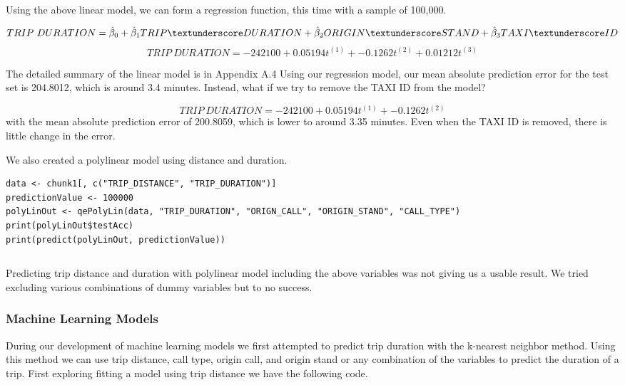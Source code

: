 \documentclass{article}
\numberwithin{equation}{section}
\begin{document}
 \\

Using the above linear model, we can form a regression function, this time with a sample of 100,000. 

\begin{equation}
    TRIP \ DURATION = \hat{\beta}_0 + \hat{\beta}_1 TRIP\textunderscore DURATION + \hat{\beta}_2 ORIGIN \textunderscore STAND + \hat{\beta}_3 TAXI \textunderscore ID \\
\end{equation}
\begin{equation}
    TRIP \ DURATION = -242100 + 0.05194t^{(1)} + -0.1262t^{(2)} + 0.01212t^{(3)}
\end{equation}

The detailed summary of the linear model is in Appendix A.4
Using our regression model, our mean absolute prediction error for the test set is 204.8012, which is around 3.4 minutes. Instead, what if we try to remove the TAXI ID from the model?

\begin{equation}
    TRIP \ DURATION = -242100 + 0.05194t^{(1)} + -0.1262t^{(2)}
\end{equation}
with the mean absolute prediction error of 200.8059, which is lower to around 3.35 minutes. Even when the TAXI ID is removed, there is little change in the error. 


We also created a polylinear model using distance and duration.
\begin{lstlisting}
data <- chunk1[, c("TRIP_DISTANCE", "TRIP_DURATION")]
predictionValue <- 100000
polyLinOut <- qePolyLin(data, "TRIP_DURATION", "ORIGN_CALL", "ORIGIN_STAND", "CALL_TYPE")
print(polyLinOut$testAcc)
print(predict(polyLinOut, predictionValue))
\end{lstlisting}
\begin{verbatim}
\end{verbatim}
Predicting trip distance and duration with polylinear model including the above variables was not giving us a usable result. We tried excluding various combinations of dummy variables but to no success. 

\newpage
\subsubsection{Machine Learning Models}


During our development of machine learning models we first attempted to predict trip duration with the k-nearest neighbor method. Using this method we can use trip distance, call type, origin call, and origin stand or any combination of the variables to predict the duration of a trip. First exploring fitting a model using trip distance we have the following code. 
\end{document}
